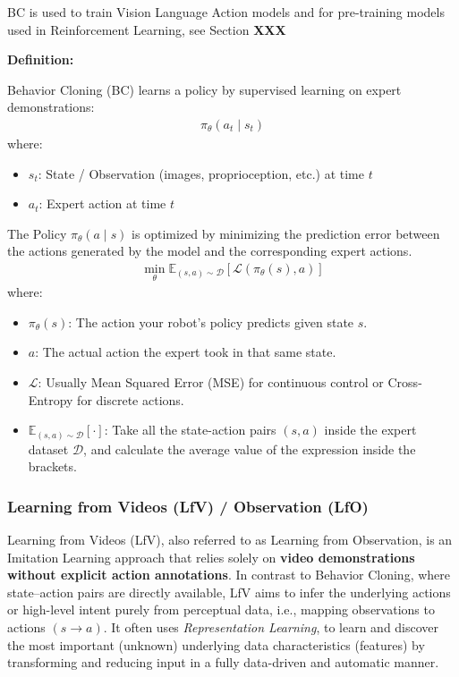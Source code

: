 BC is used to train Vision Language Action models and for pre-training models used in Reinforcement Learning, see Section \textbf{XXX}

\textbf{Definition:}

Behavior Cloning (BC) learns a policy by supervised learning on expert demonstrations:
\begin{align}
	\pi_\theta(a_t \mid s_t)
\end{align}
where:
\begin{itemize}
	\item $s_t$: State / Observation (images, proprioception, etc.) at time $t$
	\item $a_t$: Expert action at time $t$
\end{itemize}

The Policy $\pi_\theta(a \mid s)$ is optimized by minimizing the prediction error between the actions generated by the model and the corresponding expert actions.
\begin{align}
\min_{\theta} \mathbb{E}_{(s,a) \sim \mathcal{D}} \left[ \mathcal{L}(\pi_{\theta}(s), a) \right]
\end{align}
where:
\begin{itemize}
\item $\pi_{\theta}(s)$: The action your robot's policy predicts given state $s$.
\item $a$: The actual action the expert took in that same state.
\item $\mathcal{L}$: Usually Mean Squared Error (MSE) for continuous control or Cross-Entropy for discrete actions.
\item  $\mathbb{E}_{(s,a) \sim \mathcal{D}} [\cdot]$: Take all the state-action pairs $(s, a)$ inside the expert dataset $\mathcal{D}$, and calculate the average value of the expression inside the brackets.
\end{itemize}
 







  
\subsubsection{Learning from Videos (LfV) / Observation (LfO)}
Learning from Videos (LfV), also referred to as Learning from Observation, is an Imitation Learning approach that relies solely on \textbf{video demonstrations without explicit action annotations}. In contrast to Behavior Cloning, where state–action pairs are directly available, LfV aims to infer the underlying actions or high-level intent purely from perceptual data, i.e., mapping observations to actions $(s \rightarrow a)$. It often uses \textit{Representation Learning}, to learn and discover the most important (unknown) underlying data characteristics (features) by transforming and reducing input in a fully data-driven and automatic manner.

